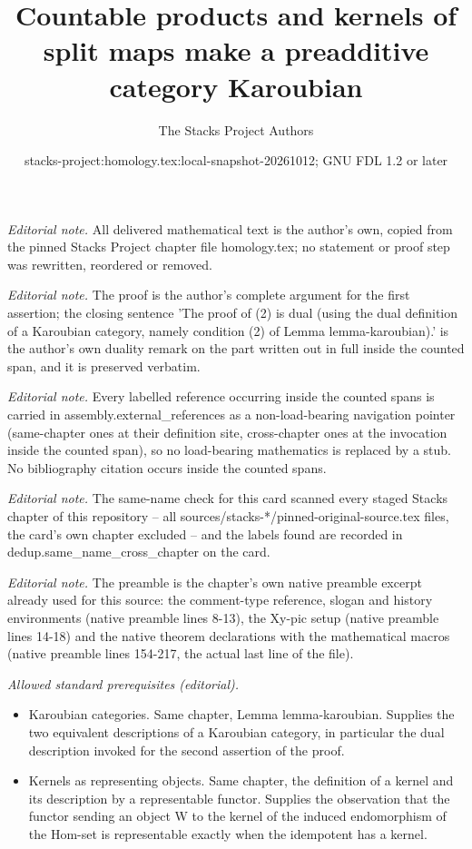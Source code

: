 \documentclass[10pt,a4paper]{amsart}
\title{Countable products and kernels of split maps make a preadditive category Karoubian}
\author{The Stacks Project Authors}
\date{stacks-project:homology.tex:local-snapshot-20261012; GNU FDL 1.2 or later}
\theoremstyle{plain}
\theoremstyle{definition}
\theoremstyle{remark}
\numberwithin{equation}{subsection}
\begin{document}
\maketitle
\noindent\textit{Editorial note.} All delivered mathematical text is the author's own, copied from the pinned Stacks Project chapter file homology.tex; no statement or proof step was rewritten, reordered or removed.\par\medskip
\noindent\textit{Editorial note.} The proof is the author's complete argument for the first assertion; the closing sentence 'The proof of (2) is dual (using the dual definition of a Karoubian category, namely condition (2) of Lemma lemma-karoubian).' is the author's own duality remark on the part written out in full inside the counted span, and it is preserved verbatim.\par\medskip
\noindent\textit{Editorial note.} Every labelled reference occurring inside the counted spans is carried in assembly.external\_references as a non-load-bearing navigation pointer (same-chapter ones at their definition site, cross-chapter ones at the invocation inside the counted span), so no load-bearing mathematics is replaced by a stub. No bibliography citation occurs inside the counted spans.\par\medskip
\noindent\textit{Editorial note.} The same-name check for this card scanned every staged Stacks chapter of this repository -- all sources/stacks-*/pinned-original-source.tex files, the card's own chapter excluded -- and the labels found are recorded in dedup.same\_name\_cross\_chapter on the card.\par\medskip
\noindent\textit{Editorial note.} The preamble is the chapter's own native preamble excerpt already used for this source: the comment-type reference, slogan and history environments (native preamble lines 8-13), the Xy-pic setup (native preamble lines 14-18) and the native theorem declarations with the mathematical macros (native preamble lines 154-217, the actual last line of the file).\par\medskip
\noindent\textit{Allowed standard prerequisites (editorial).}\begin{itemize}
\item Karoubian categories. Same chapter, Lemma lemma-karoubian. Supplies the two equivalent descriptions of a Karoubian category, in particular the dual description invoked for the second assertion of the proof.
\item Kernels as representing objects. Same chapter, the definition of a kernel and its description by a representable functor. Supplies the observation that the functor sending an object W to the kernel of the induced endomorphism of the Hom-set is representable exactly when the idempotent has a kernel.
\end{itemize}\medskip
\end{document}
